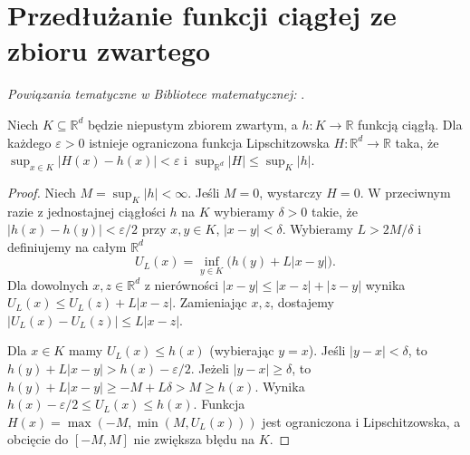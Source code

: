 \section{Przedłużanie funkcji ciągłej ze zbioru zwartego}

\noindent\emph{Powiązania tematyczne w Bibliotece matematycznej:} .


\begin{lemat}
\label{lem:lipschitz-approx-compact-10}
Niech $K\subseteq\mathbb R^d$ będzie niepustym
zbiorem zwartym, a $h:K\to\mathbb R$ funkcją ciągłą.
Dla każdego $\varepsilon>0$ istnieje ograniczona
funkcja Lipschitzowska $H:\mathbb R^d\to\mathbb R$
taka, że
$\sup_{x\in K}|H(x)-h(x)|<\varepsilon$
i $\sup_{\mathbb R^d}|H|\le\sup_K|h|$.
\end{lemat}
\begin{proof}
Niech $M=\sup_K|h|<\infty$. Jeśli $M=0$,
wystarczy $H=0$. W przeciwnym razie z jednostajnej
ciągłości $h$ na $K$ wybieramy $\delta>0$ takie, że
$|h(x)-h(y)|<\varepsilon/2$ przy
$x,y\in K$, $|x-y|<\delta$.
Wybieramy $L>2M/\delta$ i definiujemy na
całym $\mathbb R^d$
\[
U_L(x)=\inf_{y\in K}\bigl(h(y)+L|x-y|\bigr).
\]
Dla dowolnych $x,z\in\mathbb R^d$ z nierówności
$|x-y|\le|x-z|+|z-y|$ wynika
$U_L(x)\le U_L(z)+L|x-z|$. Zamieniając $x,z$,
dostajemy $|U_L(x)-U_L(z)|\le L|x-z|$.

Dla $x\in K$ mamy $U_L(x)\le h(x)$ (wybierając
$y=x$). Jeśli $|y-x|<\delta$, to
$h(y)+L|x-y|>h(x)-\varepsilon/2$.
Jeżeli $|y-x|\ge\delta$, to
$h(y)+L|x-y|\ge-M+L\delta>M\ge h(x)$.
Wynika $h(x)-\varepsilon/2\le U_L(x)\le h(x)$.
Funkcja
$H(x)=\max(-M,\min(M,U_L(x)))$
jest ograniczona i Lipschitzowska, a obcięcie do
$[-M,M]$ nie zwiększa błędu na $K$.
\end{proof}

